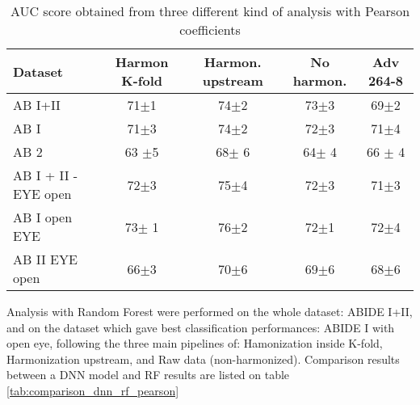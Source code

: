 \documentclass[11pt]{report}
\begin{document}
\begin{table}[!htp]\centering
\scriptsize
\begin{tabular}{lcccc}\toprule
Dataset &Harmon K-fold &Harmon. upstream &No harmon. &Adv 264-8 \\\midrule
AB I+II &71$\pm$1 &74$\pm$2 &73$\pm$3 &69$\pm$2 \\
AB I &71$\pm$3 &74$\pm$2 &72$\pm$3 &71$\pm$4 \\
AB 2 &63 $\pm$5 &68$\pm$ 6 &64$\pm$ 4 &66 $\pm$ 4 \\
AB I + II - EYE open &72$\pm$3 &75$\pm$4 &72$\pm$3 &71$\pm$3 \\
AB I open EYE &73$\pm$ 1 &76$\pm$2 &72$\pm$1 &72$\pm$4 \\
AB II EYE open &66$\pm$3 &70$\pm$6 &69$\pm$6 &68$\pm$6 \\
\bottomrule
\end{tabular}
\caption{AUC score obtained from three different kind of analysis with Pearson coefficients}
\label{tab:classification_pearson}
\end{table}


Analysis with Random Forest were performed on the whole dataset: ABIDE I+II, and on the dataset which gave best classification performances: ABIDE I with open eye, following the three main pipelines of: Hamonization inside K-fold, Harmonization upstream, and Raw data (non-harmonized).
Comparison results between a DNN model and RF results are listed on table \ref{tab:comparison_dnn_rf_pearson}
\end{document}
